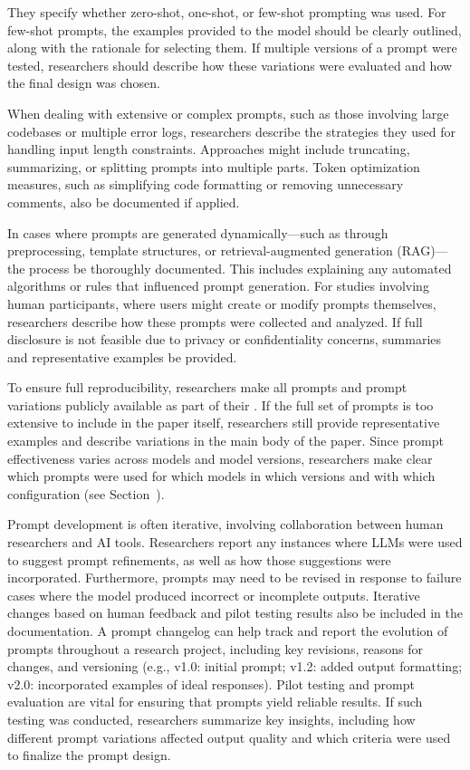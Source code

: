 They \must specify whether zero-shot, one-shot, or few-shot prompting was used. For few-shot prompts, the examples provided to the model should be clearly outlined, along with the rationale for selecting them.
If multiple versions of a prompt were tested, researchers should describe how these variations were evaluated and how the final design was chosen.

When dealing with extensive or complex prompts, such as those involving large codebases or multiple error logs, researchers \must describe the strategies they used for handling input length constraints.
Approaches might include truncating, summarizing, or splitting prompts into multiple parts.
Token optimization measures, such as simplifying code formatting or removing unnecessary comments, \must also be documented if applied.

In cases where prompts are generated dynamically—such as through preprocessing, template structures, or retrieval-augmented generation (RAG)—the process \must be thoroughly documented.
This includes explaining any automated algorithms or rules that influenced prompt generation.
For studies involving human participants, where users might create or modify prompts themselves, researchers \must describe how these prompts were collected and analyzed.
If full disclosure is not feasible due to privacy or confidentiality concerns, summaries and representative examples \should be provided.

To ensure full reproducibility, researchers \must make all prompts and prompt variations publicly available as part of their \supplementarymaterial.
If the full set of prompts is too extensive to include in the paper itself, researchers \should still provide representative examples and describe variations in the main body of the paper.
Since prompt effectiveness varies across models and model versions, researchers \must make clear which prompts were used for which models in which versions and with which configuration (see Section~\modelversion).

Prompt development is often iterative, involving collaboration between human researchers and AI tools.
Researchers \should report any instances where LLMs were used to suggest prompt refinements, as well as how those suggestions were incorporated.
Furthermore, prompts may need to be revised in response to failure cases where the model produced incorrect or incomplete outputs.
Iterative changes based on human feedback and pilot testing results \should also be included in the documentation.
A prompt changelog can help track and report the evolution of prompts throughout a research project, including key revisions, reasons for changes, and versioning (e.g., v1.0: initial prompt; v1.2: added output formatting; v2.0: incorporated examples of ideal responses).
Pilot testing and prompt evaluation are vital for ensuring that prompts yield reliable results. If such testing was conducted, researchers \should summarize key insights, including how different prompt variations affected output quality and which criteria were used to finalize the prompt design.

